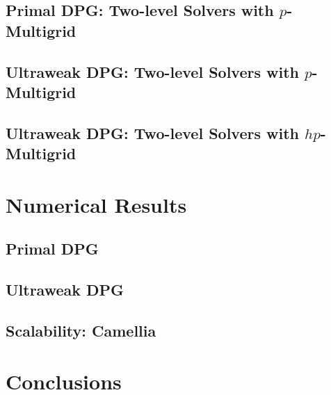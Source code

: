 \documentclass[9pt,c,3p]{elsarticle}
\begin{document}
\subsection{Primal DPG: Two-level Solvers with $p$-Multigrid}
\subsection{Ultraweak DPG: Two-level Solvers with $p$-Multigrid}
\subsection{Ultraweak DPG: Two-level Solvers with $hp$-Multigrid}

\section{Numerical Results}
\subsection{Primal DPG}

\subsection{Ultraweak DPG}

\subsection{Scalability: Camellia}

\section{Conclusions}

\clearpage



\end{document}
